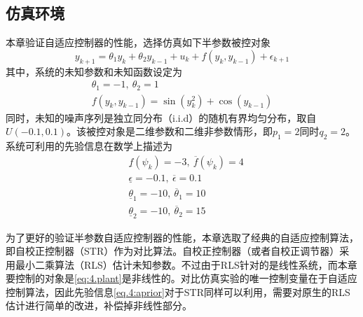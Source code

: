 \subsection{仿真环境}\label{sect:4.4.1}
本章验证自适应控制器的性能，选择仿真如下半参数被控对象
\begin{equation}\label{eq:4.plant}
y_{k+1} = \theta_{1}y_{k} + \theta_{2}y_{k-1} + u_{k} + f(y_{k},y_{k-1}) + \epsilon_{k+1} 
\end{equation}
其中，系统的未知参数和未知函数设定为
\begin{equation}
\begin{array}{c}
\theta_{1} = -1,\ \theta_{2} = 1\\
f(y_{k},y_{k-1}) = \sin(y_{k}^{2}) + \cos(y_{k-1})
\end{array}
\end{equation}
同时，未知的噪声序列是独立同分布（i.i.d）的随机有界均匀分布，取自$U(-0.1,0.1)$。该被控对象是二维参数和二维非参数情形，即$p_{1}=2$同时$q_{2}=2$。系统可利用的先验信息在数学上描述为
\begin{equation}\label{eq.4:aprior}
\begin{split}
&\underline{f}(\psi_{k})=-3,\ \overline{f}(\psi_{k})=4\\
&\underline{\epsilon}=-0.1,\ \overline{\epsilon}=0.1\\
&\underline{\theta}_{1}=-10,\ \overline{\theta}_{1}=10\\
&\underline{\theta}_{2}=-10,\ \overline{\theta}_{2}=15
\end{split}
\end{equation}

为了更好的验证半参数自适应控制器的性能，本章选取了经典的自适应控制算法，即自校正控制器（STR）作为对比算法。自校正控制器（或者自校正调节器）采用最小二乘算法（RLS）估计未知参数。不过由于RLS针对的是线性系统，而本章要控制的对象是\eqref{eq:4.plant}是非线性的。对比仿真实验的唯一控制变量在于自适应控制算法，因此先验信息\eqref{eq.4:aprior}对于STR同样可以利用，需要对原生的RLS估计进行简单的改进，补偿掉非线性部分。


